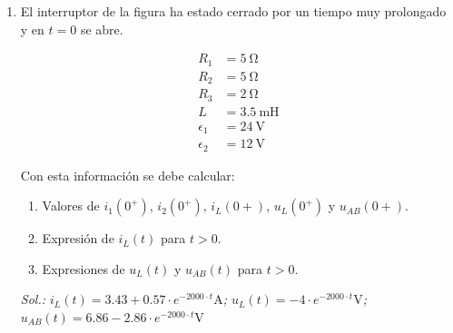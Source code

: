 \begin{enumerate}
\item El interruptor de la figura ha estado cerrado por un tiempo muy
  prolongado y en $t = 0$ se abre.

\begin{minipage}{0.5\linewidth}
\end{minipage}
\begin{minipage}{0.5\linewidth}
  \begin{align*}
    R_1 &= \SI{5}{\ohm}\\
    R_2 &= \SI{5}{\ohm}\\
    R_3 &= \SI{2}{\ohm}\\
    L &= \SI{3.5}{\milli\henry}\\
    \epsilon_1 &= \SI{24}{\volt}\\
    \epsilon_2 &= \SI{12}{\volt}
  \end{align*}
\end{minipage}

\medskip

Con esta información se debe calcular:
\begin{enumerate}
\item Valores de $i_1(0^+)$, $i_2(0^+)$, $i_L(0+)$, $u_L(0^+)$ y
  $u_{AB}(0+)$.
\item Expresión de $i_L(t)$ para $t > 0$.
\item Expresiones de $u_L(t)$ y $u_{AB}(t)$ para $t > 0$.
\end{enumerate}

\emph{Sol.: $i_L(t) = 3.43 + 0.57 \cdot e^{-2000 \cdot t} \unit{\ampere}$;
  $u_L(t) = - 4 \cdot e^{-2000 \cdot t} \unit{\volt}$;
  $u_{AB}(t) = 6.86 - 2.86 \cdot e^{-2000 \cdot t} \unit{\volt}$
}


\end{enumerate}
